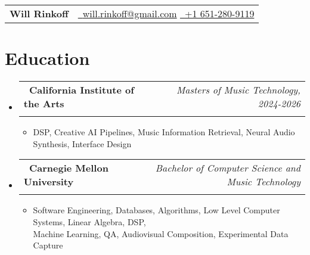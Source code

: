 \documentclass[a4paper,11pt]{article}
\makeatletter
\newcommand{\resumeSubheading}[4]{
\vspace{0.5mm}\item
    \begin{tabular*}{0.98\textwidth}[t]{l@{\extracolsep{\fill}}r}
        \textbf{#1} & \textit{\footnotesize{#4}} \\
        \textit{\footnotesize{#3}} &  \footnotesize{#2}\\
    \end{tabular*}
    \vspace{-2.4mm}
}
\newcommand{\resumeSubHeadingListStart}{\begin{itemize}[leftmargin=*,labelsep=0mm]}
\newcommand{\resumeItemListStart}{\begin{justify}\begin{itemize}[leftmargin=3ex, rightmargin=2ex, noitemsep,labelsep=1.2mm,itemsep=0mm]\small}
\newcommand{\resumeSubHeadingListEnd}{\end{itemize}\vspace{2mm}}
\newcommand{\resumeItemListEnd}{\end{itemize}\end{justify}\vspace{-2mm}}
\newcommand{\name}{Will Rinkoff} %
\newcommand{\phone}{+1 651-280-9119} %
\newcommand{\emaila}{will.rinkoff@gmail.com} %
\makeatother
\begin{document}
\selectfont




\parbox{\dimexpr\linewidth-2.8cm\relax}{
\begin{tabularx}{\linewidth}{L} 
  \textbf{\Large \name} &
  \href{mailto:\emaila}{\raisebox{0.0\height}{\footnotesize \faEnvelope}\ {\emaila}} 
  \href{}{\raisebox{0.0\height}{\footnotesize \faPhone}\ {\phone}} \\
\end{tabularx}
}


\vspace{-3.5mm}

\section{\textbf{Education}}
  \resumeSubHeadingListStart
    \resumeSubheading
      {\ California Institute of the Arts}{}
      {}{Masters of Music Technology, 2024-2026}
      \vspace{-5.0mm}
      \resumeItemListStart
        \item  
            \footnotesize {DSP, Creative AI Pipelines, Music Information Retrieval, Neural Audio Synthesis, Interface Design}
      \resumeItemListEnd
    \vspace{-3.0mm}
    \resumeSubheading
      {\ Carnegie Mellon University}{}
      {}{Bachelor of Computer Science and Music Technology}
      \vspace{-5.0mm}
      \resumeItemListStart
        \item 
            \footnotesize {Software Engineering, Databases, Algorithms, Low Level Computer Systems, Linear Algebra, DSP, \\ Machine Learning, QA, Audiovisual Composition, Experimental Data Capture}
      \resumeItemListEnd
    \vspace{-4.0mm}
  \resumeSubHeadingListEnd
\vspace{-7mm}

\end{document}
